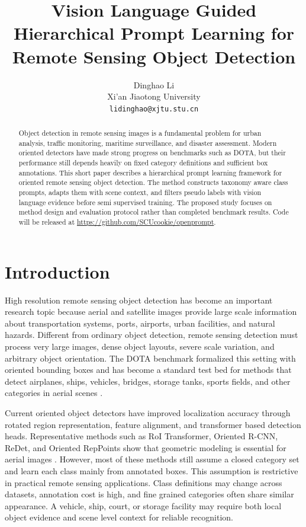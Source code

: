 \documentclass[10pt]{article}
\title{\vspace{-1.5em}Vision Language Guided Hierarchical Prompt Learning for Remote Sensing Object Detection}
\author{
Dinghao Li\\
Xi'an Jiaotong University\\
\texttt{lidinghao@xjtu.stu.cn}
}
\date{}
\begin{document}
\maketitle
\vspace{-1.5em}

\begin{abstract}
Object detection in remote sensing images is a fundamental problem for urban analysis, traffic monitoring, maritime surveillance, and disaster assessment. Modern oriented detectors have made strong progress on benchmarks such as DOTA, but their performance still depends heavily on fixed category definitions and sufficient box annotations. This short paper describes a hierarchical prompt learning framework for oriented remote sensing object detection. The method constructs taxonomy aware class prompts, adapts them with scene context, and filters pseudo labels with vision language evidence before semi supervised training. The proposed study focuses on method design and evaluation protocol rather than completed benchmark results. Code will be released at \url{https://github.com/SCUcookie/openprompt}.
\end{abstract}

\section{Introduction}

High resolution remote sensing object detection has become an important research topic because aerial and satellite images provide large scale information about transportation systems, ports, airports, urban facilities, and natural hazards. Different from ordinary object detection, remote sensing detection must process very large images, dense object layouts, severe scale variation, and arbitrary object orientation. The DOTA benchmark formalized this setting with oriented bounding boxes and has become a standard test bed for methods that detect airplanes, ships, vehicles, bridges, storage tanks, sports fields, and other categories in aerial scenes \cite{xia2018dota}.

Current oriented object detectors have improved localization accuracy through rotated region representation, feature alignment, and transformer based detection heads. Representative methods such as RoI Transformer, Oriented R-CNN, ReDet, and Oriented RepPoints show that geometric modeling is essential for aerial images \cite{ding2019roit, xie2021orientedrcnn, han2021redet, li2022orientedreppoints}. However, most of these methods still assume a closed category set and learn each class mainly from annotated boxes. This assumption is restrictive in practical remote sensing applications. Class definitions may change across datasets, annotation cost is high, and fine grained categories often share similar appearance. A vehicle, ship, court, or storage facility may require both local object evidence and scene level context for reliable recognition.
\end{document}
